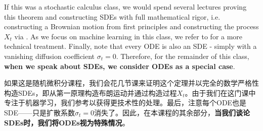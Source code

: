 If this was a stochastic calculus class, we would spend several lectures proving this theorem and constructing SDEs with full mathematical rigor, i.e. constructing a Brownian motion from first principles and constructing the process $X_{t}$ via . As we focus on machine learning in this class, we refer to \citep{mao2007stochastic} for a more technical treatment. Finally, note that every ODE is also an SDE - simply with a vanishing diffusion coefficient $\sigma_t=0$. Therefore, for the remainder of this class, \textbf{when we speak about SDEs, we consider ODEs as a special case}.


如果这是随机微积分课程，我们会花几节课来证明这个定理并以完全的数学严格性构造SDEs，即从第一原理构造布朗运动并通过构造过程$X_{t}$。由于我们在这门课中专注于机器学习，我们参考\citep{mao2007stochastic}以获得更技术性的处理。最后，注意每个ODE也是SDE——只是扩散系数$\sigma_t=0$消失了。因此，在本课程的其余部分，\textbf{当我们谈论SDEs时，我们将ODEs视为特殊情况}。

